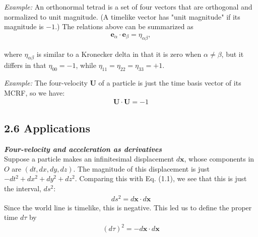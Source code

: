 \documentclass[11pt,letterpaper]{book}
\begin{document}
        \textit{Example:} An orthonormal tetrad is a set of four vectors that are orthogonal and normalized to unit magnitude. (A timelike vector has "unit magnitude" if its magnitude is \(-1\).) The relations above can be summarized as
        \begin{align}
        \mathbf{e}_\alpha \cdot \mathbf{e}_\beta = \eta_{\alpha\beta},
        \end{align}
        
        where \(\eta_{\alpha\beta}\) is similar to a Kronecker delta in that it is zero when \(\alpha \neq \beta\), but it differs in that \(\eta_{00} = -1\), while \(\eta_{11} = \eta_{22} = \eta_{33} = +1\).
    
         \textit{Example:} The four-velocity \(\mathbf{U}\) of a particle is just the time basis vector of its MCRF, so we have:
        \begin{align}
            \mathbf{U}\cdot \mathbf{U} = -1
        \end{align}
        
        
    \subsection{2.6 Applications }

    \textit{\textbf{Four-velocity and acceleration as derivatives}}\\
    
        Suppose a particle makes an infinitesimal displacement \( d\mathbf{x} \), whose components in \( O \) are \( (dt, dx, dy, dz) \). The magnitude of this displacement is just \( -dt^2 + dx^2 + dy^2 + dz^2 \). Comparing this with Eq. (1.1), we see that this is just the interval, \( ds^2 \):
        \begin{align}
        ds^2 = d\mathbf{x} \cdot d\mathbf{x}
        \end{align}
        Since the world line is timelike, this is negative. This led us to define the proper time \( d\tau \) by
        \begin{align}
        (d\tau)^2 = -d\mathbf{x} \cdot d\mathbf{x}
        \end{align}
        
\end{document}
